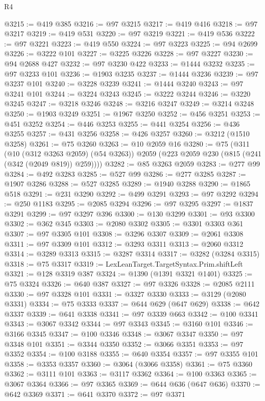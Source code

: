 \begin{lexlean}{R4}
\begin{coremodule}
@3215 := @419 @385
@3216 := @97 @3215
@3217 := @419 @416
@3218 := @97 @3217
@3219 := @419 @531
@3220 := @97 @3219
@3221 := @419 @536
@3222 := @97 @3221
@3223 := @419 @550
@3224 := @97 @3223
@3225 := @94 @2699
@3226 := @3222 @101
@3227 := @3225 @3226
@3228 := @97 @3227
@3230 := @94 @2688 @427
@3232 := @97 @3230 @422
@3233 := @1444 @3232
@3235 := @97 @3233 @101
@3236 := @1903 @3235
@3237 := @1444 @3236
@3239 := @97 @3237 @101
@3240 := @3228 @3239
@3241 := @1444 @3240
@3243 := @97 @3241 @101
@3244 := @3224 @3243
@3245 := @3222 @3244
@3246 := @3220 @3245
@3247 := @3218 @3246
@3248 := @3216 @3247
@3249 := @3214 @3248
@3250 := @1903 @3249
@3251 := @1967 @3250
@3252 := @456 @3251
@3253 := @451 @3252
@3254 := @446 @3253
@3255 := @441 @3254
@3256 := @436 @3255
@3257 := @431 @3256
@3258 := @426 @3257
@3260 := @3212 (@1510 @3258)
@3261 := @75 @3260
@3263 := @10 @2059 @16
@3280 := @75
    (@311
      (@10 (@312 @3263 @2059) (@54 @3263))
      @2059
      (@223 @2059 @230 (@815 (@241 (@342 (@2049 @819)) @259))))
@3282 := @85 @3263 @2059
@3283 := @277 @99
@3284 := @492 @3283
@3285 := @527 @99
@3286 := @277 @3285
@3287 := @1907 @3286
@3288 := @527 @3285
@3289 := @1940 @3288
@3290 := @1865 @518
@3291 := @231 @3290
@3292 := @499 @3291
@3293 := @97 @3292
@3294 := @250 @1183
@3295 := @2085 @3294
@3296 := @97 @3295
@3297 := @1837 @3291
@3299 := @97 @3297 @396
@3300 := @130 @3299
@3301 := @93 @3300
@3302 := @362 @345
@3303 := @2080 @3302
@3305 := @3301 @3303 @361
@3307 := @97 @3305 @101
@3308 := @3296 @3307
@3309 := @2061 @3308
@3311 := @97 @3309 @101
@3312 := @3293 @3311
@3313 := @2060 @3312
@3314 := @3289 @3313
@3315 := @3287 @3314
@3317 := @3282 (@3284 @3315)
@3318 := @75 @3317
@3319 := LexLeanTarget.TargetSyntax.Prim.shiftLeft
@3321 := @128 @3319 @387
@3324 := @1390 (@1391 @3321 @1401)
@3325 := @75 @3324
@3326 := @640 @387
@3327 := @97 @3326
@3328 := @2085 @2111
@3330 := @97 @3328 @101
@3331 := @3327 @3330
@3333 := @3129 (@2080 @3331)
@3334 := @75 @3333
@3337 := @644 @629 (@647 @629)
@3338 := @642 @3337
@3339 := @641 @3338
@3341 := @97 @3339 @663
@3342 := @100 @3341
@3343 := @3067 @3342
@3344 := @97 @3343
@3345 := @3160 @101
@3346 := @3166 @3345
@3347 := @100 @3346
@3348 := @3067 @3347
@3350 := @97 @3348 @101
@3351 := @3344 @3350
@3352 := @3066 @3351
@3353 := @97 @3352
@3354 := @100 @3188
@3355 := @640 @3354
@3357 := @97 @3355 @101
@3358 := @3353 @3357
@3360 := @3064 (@3066 @3358)
@3361 := @75 @3360
@3362 := @3111 @101
@3363 := @3117 @3362
@3364 := @100 @3363
@3365 := @3067 @3364
@3366 := @97 @3365
@3369 := @644 @636 (@647 @636)
@3370 := @642 @3369
@3371 := @641 @3370
@3372 := @97 @3371

\end{coremodule}
\end{lexlean}
